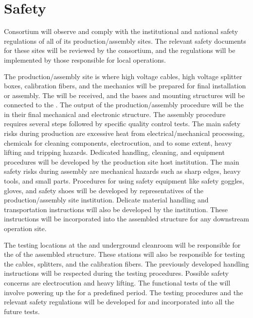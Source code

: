 \section{Safety}
\label{sec:dp-pds-safety}

\dual {} Consortium will observe and comply with the institutional and national safety regulations of all of its production/assembly sites. The relevant safety documents for these sites will be reviewed by the consortium, and the regulations will be implemented by those responsible for local operations.

The production/assembly site is where high voltage cables, high voltage splitter boxes, calibration fibers, and the  mechanics will be prepared for final installation or assembly. The  will be received, and the bases and mounting structures will be connected to the . The output of the production/assembly procedure will be the  in their final mechanical and electronic structure. The assembly procedure requires several steps followed by specific quality control tests. The main safety risks during production are excessive heat from electrical/mechanical processing, chemicals for cleaning components, electrocution, and to some extent, heavy lifting and tripping hazards. Dedicated handling, cleaning, and equipment procedures will be developed by the production site host institution. The main safety risks during assembly are mechanical hazards such as sharp edges, heavy tools, and small parts. Procedures for using safety equipment like safety goggles, gloves, and safety shoes will be developed by representatives of the production/assembly site institution. Delicate material handling and transportation instructions will also be developed by the institution. These instructions will be incorporated into the assembled structure for any downstream operation site.

The testing locations at the  and underground cleanroom  will be responsible for the  of the assembled  structure. These stations will also be responsible for testing the  cables,  splitters, and the calibration fibers. The previously developed handling instructions will be respected during the testing procedures. Possible safety concerns are electrocution and heavy lifting. The functional tests of the  will involve powering up the  for a predefined period. The testing procedures and the relevant safety regulations will be developed for and incorporated into all the future  tests.

